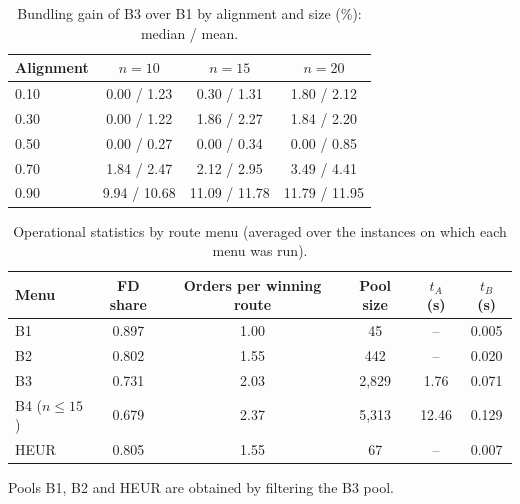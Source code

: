 \documentclass[review,12pt]{elsarticle}
\theoremstyle{definition}
\theoremstyle{remark}
\begin{document}
\begin{table}[h]
\centering
\caption{Bundling gain of B3 over B1 by alignment and size (\%): median / mean.}
\label{tab:rq2n}
\small
\begin{tabular}{lccc}
\toprule
Alignment & $n=10$ & $n=15$ & $n=20$\\
\midrule
0.10 & 0.00 / 1.23 & 0.30 / 1.31 & 1.80 / 2.12\\
0.30 & 0.00 / 1.22 & 1.86 / 2.27 & 1.84 / 2.20\\
0.50 & 0.00 / 0.27 & 0.00 / 0.34 & 0.00 / 0.85\\
0.70 & 1.84 / 2.47 & 2.12 / 2.95 & 3.49 / 4.41\\
0.90 & 9.94 / 10.68 & 11.09 / 11.78 & 11.79 / 11.95\\
\bottomrule
\end{tabular}
\end{table}

\begin{table}[h]
\centering
\caption{Operational statistics by route menu (averaged over the instances on which each menu was run).}
\label{tab:rq2ops}
\small
\begin{tabular}{lccccc}
\toprule
Menu & FD share & Orders per winning route & Pool size & $t_A$ (s) & $t_B$ (s)\\
\midrule
B1 & 0.897 & 1.00 & 45 & -- & 0.005\\
B2 & 0.802 & 1.55 & 442 & -- & 0.020\\
B3 & 0.731 & 2.03 & 2,829 & 1.76 & 0.071\\
B4 ($n\le15$) & 0.679 & 2.37 & 5,313 & 12.46 & 0.129\\
HEUR & 0.805 & 1.55 & 67 & -- & 0.007\\
\bottomrule
\end{tabular}

\smallskip\footnotesize Pools B1, B2 and HEUR are obtained by filtering the B3 pool.
\end{table}
\end{document}
